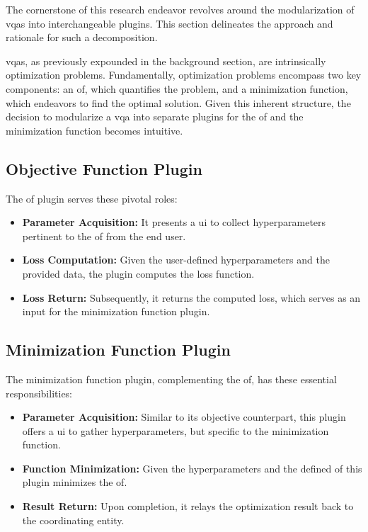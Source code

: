\documentclass[
  a4paper,  %
  twoside,  %
  bibliography=totoc,
  headsepline,
  cleardoublepage=empty,
  parskip=half,
  draft=false
]{scrbook}
\begin{document}
The cornerstone of this research endeavor revolves around the modularization of \glspl{vqa} into interchangeable plugins.
This section delineates the approach and rationale for such a decomposition.

\glspl{vqa}, as previously expounded in the background section, are intrinsically optimization problems.
Fundamentally, optimization problems encompass two key components: an \gls{of}, which quantifies the problem, and a minimization function, which endeavors to find the optimal solution.
Given this inherent structure, the decision to modularize a \gls{vqa} into separate plugins for the \gls{of} and the minimization function becomes intuitive.

\subsection{Objective Function Plugin}
The \gls{of} plugin serves these pivotal roles:

\begin{itemize}
\item \textbf{Parameter Acquisition:} It presents a \gls{ui} to collect hyperparameters pertinent to the \gls{of} from the end user.
\item \textbf{Loss Computation:} Given the user-defined hyperparameters and the provided data, the plugin computes the loss function.
\item \textbf{Loss Return:} Subsequently, it returns the computed loss, which serves as an input for the minimization function plugin.
\end{itemize}

\subsection{Minimization Function Plugin}
The minimization function plugin, complementing the \gls{of}, has these essential responsibilities:

\begin{itemize}
\item \textbf{Parameter Acquisition:} Similar to its objective counterpart, this plugin offers a \gls{ui} to gather hyperparameters, but specific to the minimization function.
\item \textbf{Function Minimization:} Given the hyperparameters and the defined \gls{of} this plugin minimizes the \gls{of}.
\item \textbf{Result Return:} Upon completion, it relays the optimization result back to the coordinating entity.
\end{itemize}
\end{document}
